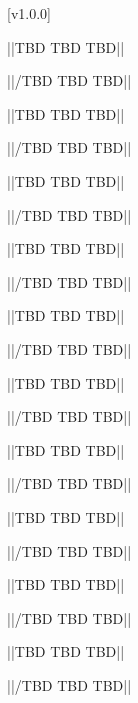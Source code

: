 [v1.0.0]

||TBD TBD TBD||

||/TBD TBD TBD||


||TBD TBD TBD||

||/TBD TBD TBD||


||TBD TBD TBD||

||/TBD TBD TBD||


\secondaryEnd{}


||TBD TBD TBD||

||/TBD TBD TBD||


||TBD TBD TBD||

||/TBD TBD TBD||

\tertiaryEnd{}


||TBD TBD TBD||

||/TBD TBD TBD||

\tertiaryEnd{}


||TBD TBD TBD||

||/TBD TBD TBD||

\tertiaryEnd{}


||TBD TBD TBD||

||/TBD TBD TBD||

\tertiaryEnd{}


||TBD TBD TBD||

||/TBD TBD TBD||

\tertiaryEnd{}


||TBD TBD TBD||

||/TBD TBD TBD||

\tertiaryEnd{}


